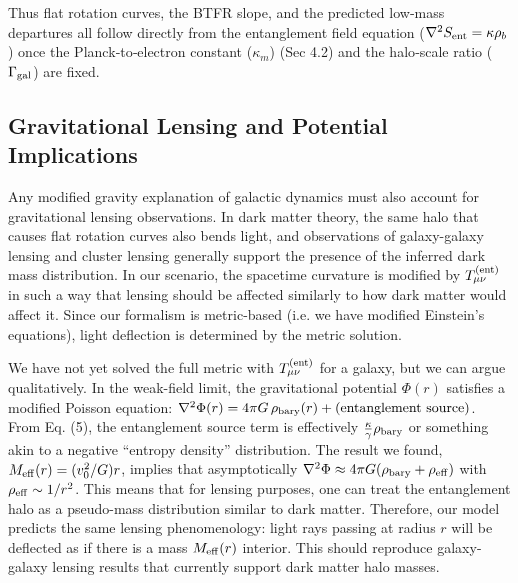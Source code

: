 \documentclass[11pt]{article}
\begin{document}
Thus flat rotation curves, the BTFR slope, and the predicted low‑mass departures all follow directly from the entanglement field equation ($\nabla^2S_{\rm ent}= \kappa\rho_b$) once the Planck‑to‑electron constant ($\kappa_m$) (Sec 4.2) and the halo‑scale ratio ($\Gamma_{\rm gal}$) are fixed.

\subsection{Gravitational Lensing and Potential Implications}

Any modified gravity explanation of galactic dynamics must also account for gravitational lensing observations. In dark matter theory, the same halo that causes flat rotation curves also bends light, and observations of galaxy-galaxy lensing and cluster lensing generally support the presence of the inferred dark mass distribution. In our scenario, the spacetime curvature is modified by $T_{\mu\nu}^{(\rm ent)}$ in such a way that lensing should be affected similarly to how dark matter would affect it. Since our formalism is metric-based (i.e. we have modified Einstein’s equations), light deflection is determined by the metric solution.

We have not yet solved the full metric with $T_{\mu\nu}^{\rm (ent)}$ for a galaxy, but we can argue qualitatively. In the weak-field limit, the gravitational potential $\Phi(r)$ satisfies a modified Poisson equation: 
$\nabla^2 \Phi(r) = 4\pi G\,\rho_{\rm bary}(r) + \text{(entanglement source)}$. 
From Eq. (5), the entanglement source term is effectively $\frac{\kappa}{\gamma}\rho_{\rm bary}$ or something akin to a negative “entropy density” distribution. The result we found, $M_{\rm eff}(r) = (v_0^2/G)r$, implies that asymptotically $\nabla^2 \Phi \approx 4\pi G (\rho_{\rm bary} + \rho_{\rm eff})$ with $\rho_{\rm eff}\sim 1/r^2$. This means that for lensing purposes, one can treat the entanglement halo as a pseudo-mass distribution similar to dark matter. Therefore, our model predicts the same lensing phenomenology: light rays passing at radius $r$ will be deflected as if there is a mass $M_{\rm eff}(r)$ interior. This should reproduce galaxy-galaxy lensing results that currently support dark matter halo masses.
\end{document}

